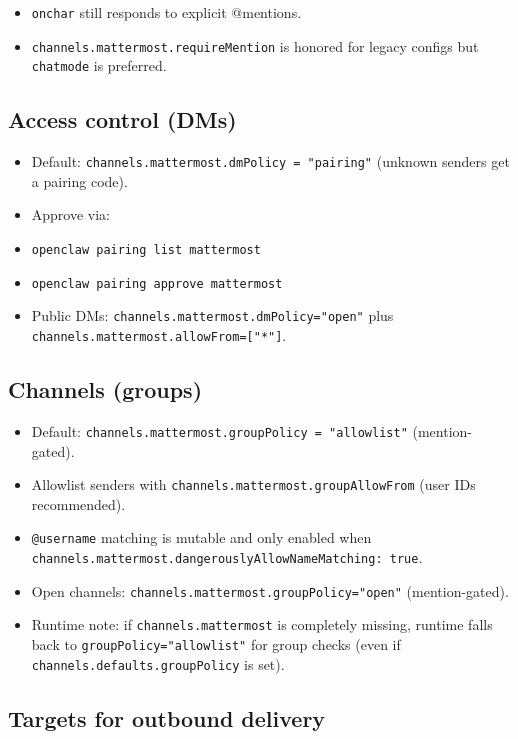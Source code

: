 \begin{itemize}
  \item \texttt{onchar} still responds to explicit @mentions.
  \item \texttt{channels.mattermost.requireMention} is honored for legacy configs but \texttt{chatmode} is preferred.
\end{itemize}


\subsection{Access control (DMs)}


\begin{itemize}
  \item Default: \texttt{channels.mattermost.dmPolicy = "pairing"} (unknown senders get a pairing code).
  \item Approve via:
  \item \texttt{openclaw pairing list mattermost}
  \item \texttt{openclaw pairing approve mattermost }
  \item Public DMs: \texttt{channels.mattermost.dmPolicy="open"} plus \texttt{channels.mattermost.allowFrom=["*"]}.
\end{itemize}


\subsection{Channels (groups)}


\begin{itemize}
  \item Default: \texttt{channels.mattermost.groupPolicy = "allowlist"} (mention-gated).
  \item Allowlist senders with \texttt{channels.mattermost.groupAllowFrom} (user IDs recommended).
  \item \texttt{@username} matching is mutable and only enabled when \texttt{channels.mattermost.dangerouslyAllowNameMatching: true}.
  \item Open channels: \texttt{channels.mattermost.groupPolicy="open"} (mention-gated).
  \item Runtime note: if \texttt{channels.mattermost} is completely missing, runtime falls back to \texttt{groupPolicy="allowlist"} for group checks (even if \texttt{channels.defaults.groupPolicy} is set).
\end{itemize}


\subsection{Targets for outbound delivery}


